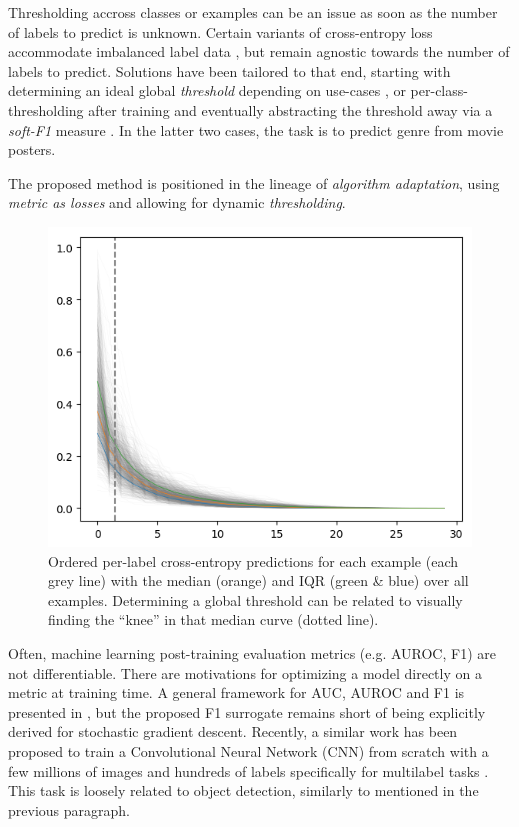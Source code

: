 Thresholding accross classes or examples can be an issue as soon as the number of labels to predict is unknown. Certain variants of cross-entropy loss accommodate imbalanced label data  \cite{focalLoss}, but remain agnostic towards the number of labels to predict. Solutions have been tailored to that end, starting with determining an ideal global \emph{threshold} depending on use-cases \cite{threshForF1}, or per-class-thresholding after training \cite{moviePosters} and eventually abstracting the threshold away via a \emph{soft-F1} measure \cite{softF1}. In the latter two cases, the task is to predict genre from movie posters.

The proposed method is positioned in the lineage of \emph{algorithm adaptation}, using \emph{metric as losses} and allowing for dynamic \emph{thresholding}. 

\begin{figure}[htbp]
\centering
\includegraphics[width=.9\linewidth]{./images/knee.png}
\caption{\label{fig:knee}
Ordered per-label cross-entropy predictions for each example (each grey line) with the median (orange) and IQR (green \& blue) over all examples. Determining a global threshold can be related to visually finding the ``knee'' in that median curve (dotted line).}
\end{figure}


Often, machine learning post-training evaluation metrics (e.g. AUROC, F1) are
not differentiable. There are motivations  for
optimizing a model directly on a metric at training time. A general framework
for AUC, AUROC and F1 is presented in \cite{optimizableLosses}, but the
proposed F1 surrogate remains short of being explicitly derived for stochastic
gradient descent. Recently, a similar work has been proposed to train a
Convolutional Neural Network (CNN) from scratch with a few millions of images
and hundreds of labels specifically for multilabel tasks \cite{tencent}. This
task is loosely related to object detection, similarly to
\cite{multitaskLabelImages} mentioned in the previous paragraph.

